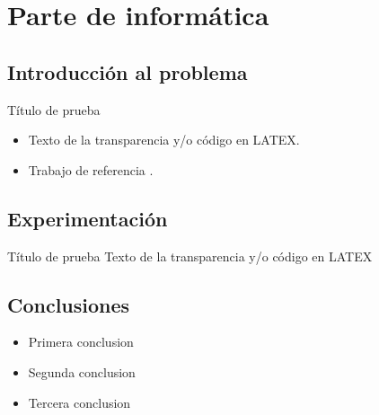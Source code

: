 \section{Parte de informática}

\subsection{Introducción al problema}
\begin{frame}{Título de prueba}
	\begin{itemize}
		\item Texto de la transparencia y/o código en LATEX.
		\item Trabajo de referencia \cite{informatica:principal}.
	\end{itemize}
\end{frame}

\subsection{Experimentación}
\begin{frame}{Título de prueba}
	Texto de la transparencia y/o código en LATEX
\end{frame}

\subsection{Conclusiones}
\begin{frame}
	\begin{itemize}
		\item Primera conclusion
		\item Segunda conclusion
		\item Tercera conclusion
	\end{itemize}
\end{frame}
